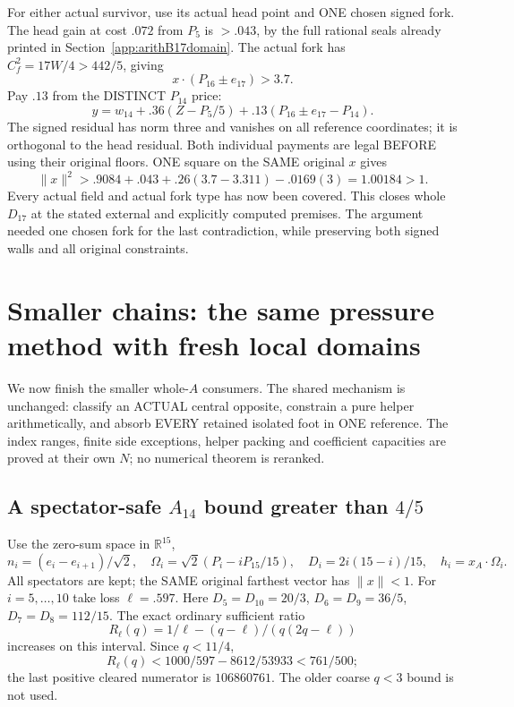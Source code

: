 For either actual survivor, use its actual
head point and ONE chosen signed fork.
The head gain at cost \(.072\) from \(P_5\)
is \(>.043\), by the full rational seals already
printed in Section~\ref{app:arithB17domain}.
The actual fork has
\(C_f^2=17W/4>442/5\), giving
\[
                 x\cdot(P_{16}\pm e_{17})>3.7 .
\]
Pay \(.13\) from the DISTINCT \(P_{14}\) price:
\[
             y=w_{14}+.36(Z-P_5/5)
                          +.13(P_{16}\pm e_{17}-P_{14}).
\]
The signed residual has norm three and
vanishes on all reference coordinates;
it is orthogonal to the head residual.
Both individual payments are legal BEFORE
using their original floors.
ONE square on the SAME original \(x\) gives
\[
              \|x\|^2>.9084+.043+.26(3.7-3.311)-.0169(3)
                                     =1.00184>1 .
\]
Every actual field and actual fork type has
now been covered.
This closes whole \(D_{17}\) at the stated
external and explicitly computed premises.
The argument needed one chosen fork for the
last contradiction, while preserving both
signed walls and all original constraints.

\section{Smaller chains: the same pressure method with fresh local domains}
\label{app:arithsmallerchains}

We now finish the smaller whole-\(A\) consumers.
The shared mechanism is unchanged: classify an
ACTUAL central opposite, constrain a pure helper
arithmetically, and absorb EVERY retained isolated
foot in ONE reference.
The index ranges, finite side exceptions, helper
packing and coefficient capacities are proved at
their own \(N\); no numerical theorem is reranked.

\subsection{A spectator-safe \(A_{14}\) bound greater than \(4/5\)}
\label{app:arithA14fourfifths}

Use the zero-sum space in \(\mathbb R^{15}\),
\[
 n_i=(e_i-e_{i+1})/\sqrt2,\quad
 \Omega_i=\sqrt2(P_i-iP_{15}/15),\quad
 D_i=2i(15-i)/15,\quad h_i=x_A\cdot\Omega_i .
\]
All spectators are kept; the SAME original
farthest vector has \(\|x\|<1\).
For \(i=5,\ldots,10\) take loss
\(\ell=.597\).
Here \(D_5=D_{10}=20/3\),
\(D_6=D_9=36/5\), \(D_7=D_8=112/15\).
The exact ordinary sufficient ratio
\[
 R_\ell(q)=1/\ell-(q-\ell)/(q(2q-\ell))
\]
increases on this interval.
Since \(q<11/4\),
\[
 R_\ell(q)<1000/597-8612/53933<761/500 ;
\]
the last positive cleared numerator is \(106860761\).
The older coarse \(q<3\) bound is not used.

